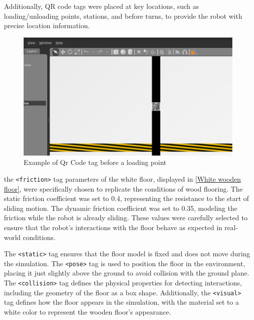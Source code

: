 \documentclass[../../main]{subfiles}
\begin{document}
\begin{itemize}
    Additionally, QR code tags were placed at key locations, such as loading/unloading points, stations, and before 
    turns, to provide the robot with precise location information.

    \begin{figure}[H]
        \centering
    \includegraphics[width=\textwidth]{fig/qr_code_tag.png}
    \caption{Example of Qr Code tag before a loading point}
    \label{Qr Code tags} %
    \end{figure}

    the \texttt{<friction>} tag parameters of the white floor, displayed in \cref{White wooden floor}, 
were specifically chosen to replicate the conditions of wood flooring. 
The static friction coefficient was set to 0.4, representing the 
resistance to the start of sliding motion. The dynamic friction coefficient was set 
to 0.35, modeling the friction while the robot is already sliding. These values were 
carefully selected to ensure that the robot's interactions with the floor behave as 
expected in real-world conditions.

The \texttt{<static>} tag ensures that the floor model is fixed and does not move 
during the simulation. The \texttt{<pose>} tag is used to position the floor in the 
environment, placing it just slightly above the ground to avoid collision with the 
ground plane. The \texttt{<collision>} tag defines the physical properties for 
detecting interactions, including the geometry of the floor as a box shape. 
Additionally, the \texttt{<visual>} tag defines how the floor appears in the simulation, 
with the material set to a white color to represent the wooden floor's appearance. 

\newpage


\end{itemize}
\end{document}
